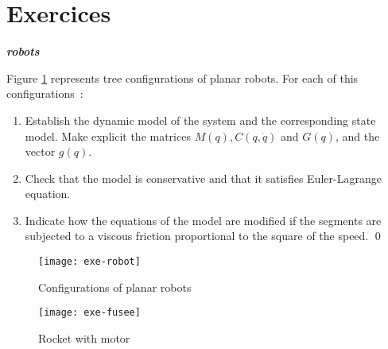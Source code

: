\section{Exercices}

\begin{exercice}{\bf \em {} robots}

Figure \ref{Fig:exe-robot} represents tree configurations of planar robots. For each of this configurations~:
\begin{enumerate}
\item Establish the dynamic model of the system and the corresponding state model. Make explicit the matrices $M(q), C(q,\dot q)$ and $G(q)$, and the vector $g(q)$.
\item Check that the model is conservative and that it satisfies Euler-Lagrange equation.
\item Indicate how the equations of the model are modified if the segments are subjected to a viscous friction proportional to the square of the speed. \qed 
\end{enumerate}
\begin{figure}[ht]
\begin{center}
\texttt{[image: exe-robot]}
\caption{Configurations of  planar robots}
\label{Fig:exe-robot}
\end{center}
\end{figure}
\end{exercice}
\vv
\begin{figure}[!h]
\begin{center}
\texttt{[image: exe-fusee]}
\caption{Rocket with  motor}
\label{Fig:exe-fusee}
\end{center}
\end{figure}
